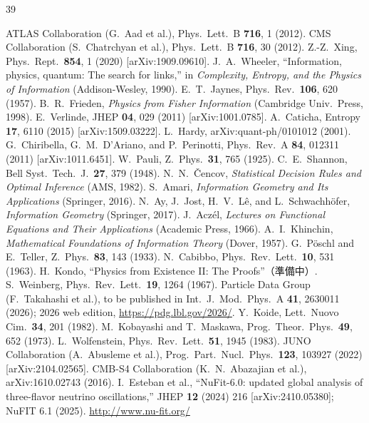 \documentclass[fontsize=11pt,paper=a4,lualatex]{jlreq}
\begin{document}
\begin{thebibliography}{39}
\setlength{\itemsep}{1pt}
\setlength{\parskip}{0pt}

 ATLAS Collaboration (G.~Aad et al.),
  Phys.\ Lett.\ B \textbf{716}, 1 (2012).
 CMS Collaboration (S.~Chatrchyan et al.),
  Phys.\ Lett.\ B \textbf{716}, 30 (2012).
 Z.-Z.~Xing, Phys.\ Rept.\ \textbf{854}, 1 (2020) [arXiv:1909.09610].
 J.~A.~Wheeler, ``Information, physics, quantum:
  The search for links,'' in \textit{Complexity, Entropy, and the
  Physics of Information} (Addison-Wesley, 1990).
 E.~T.~Jaynes, Phys.\ Rev.\ \textbf{106}, 620 (1957).
 B.~R.~Frieden, \textit{Physics from Fisher Information}
  (Cambridge Univ.\ Press, 1998).
 E.~Verlinde, JHEP \textbf{04}, 029 (2011)
  [arXiv:1001.0785].
 A.~Caticha, Entropy \textbf{17}, 6110 (2015)
  [arXiv:1509.03222].
 L.~Hardy, arXiv:quant-ph/0101012 (2001).
 G.~Chiribella, G.~M.~D'Ariano, and P.~Perinotti,
  Phys.\ Rev.\ A \textbf{84}, 012311 (2011) [arXiv:1011.6451].
 W.~Pauli, Z.\ Phys.\ \textbf{31}, 765 (1925).
 C.~E.~Shannon, Bell Syst.\ Tech.\ J.\ \textbf{27}, 379 (1948).
 N.~N.~\v{C}encov, \textit{Statistical Decision Rules
  and Optimal Inference} (AMS, 1982).
 S.~Amari, \textit{Information Geometry and Its Applications}
  (Springer, 2016).
 N.~Ay, J.~Jost, H.~V.~L\^e, and L.~Schwachh\"ofer,
  \textit{Information Geometry} (Springer, 2017).
 J.~Acz\'el, \textit{Lectures on Functional Equations and Their Applications}
  (Academic Press, 1966).
 A.~I.~Khinchin, \textit{Mathematical Foundations of
  Information Theory} (Dover, 1957).
 G.~P\"oschl and E.~Teller,
  Z.\ Phys.\ \textbf{83}, 143 (1933).
 N.~Cabibbo, Phys.\ Rev.\ Lett.\ \textbf{10}, 531 (1963).
 H.~Kondo, ``Physics from Existence II: The Proofs''（準備中）.
 S.~Weinberg, Phys.\ Rev.\ Lett.\ \textbf{19}, 1264 (1967).
 Particle Data Group (F.~Takahashi et al.), to be published in
  Int.\ J.\ Mod.\ Phys.\ A \textbf{41}, 2630011 (2026);
  2026 web edition, \url{https://pdg.lbl.gov/2026/}.
 Y.~Koide, Lett.\ Nuovo Cim.\ \textbf{34}, 201 (1982).
 M.~Kobayashi and T.~Maskawa,
  Prog.\ Theor.\ Phys.\ \textbf{49}, 652 (1973).
 L.~Wolfenstein, Phys.\ Rev.\ Lett.\ \textbf{51}, 1945 (1983).
 JUNO Collaboration (A.~Abusleme et al.),
  Prog.\ Part.\ Nucl.\ Phys.\ \textbf{123}, 103927 (2022) [arXiv:2104.02565].
 CMB-S4 Collaboration (K.~N.~Abazajian et al.),
  arXiv:1610.02743 (2016).
 I.~Esteban et al., ``NuFit-6.0: updated global analysis of three-flavor neutrino oscillations,'' JHEP \textbf{12} (2024) 216
  [arXiv:2410.05380]; NuFIT 6.1 (2025). \url{http://www.nu-fit.org/}


\end{thebibliography}
\end{document}
